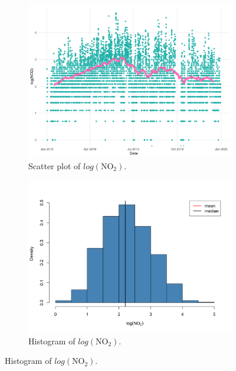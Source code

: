 \documentclass[a4paper, 10pt]{article}
\begin{document}
         \begin{figure}[H]
            \centering
            \begin{subfigure}[t]{0.48\linewidth}
               \centering
               \includegraphics[width=\linewidth]{../images/log_no2_scatter_2019.png}
               \caption{Scatter plot of $log(\text{NO}_{2})$.}
            \end{subfigure}
            \hfill
            \begin{subfigure}[t]{0.48\linewidth}
               \centering
               \includegraphics[width=\linewidth]{../images/log_no2_hist_2019.png}
               \caption{Histogram of $log(\text{NO}_{2})$.}
            \end{subfigure}
         \end{figure}
\end{document}
